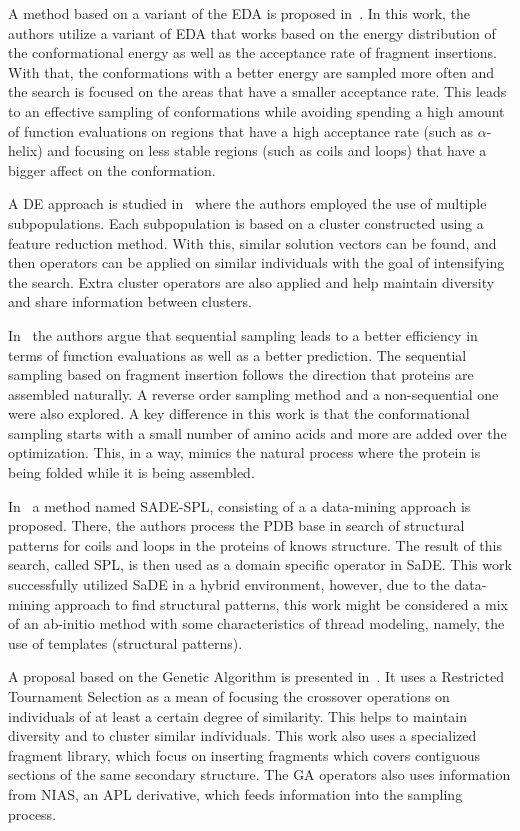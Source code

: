 A method based on a variant of the \ac{EDA} is proposed in~\cite{hao2017double}. In
this work, the authors utilize a variant of \ac{EDA} that works based on the energy
distribution of the conformational energy as well as the acceptance rate of fragment
insertions. With that, the conformations with a better energy are sampled more often
and the search is focused on the areas that have a smaller acceptance rate. This
leads to an effective sampling of conformations while avoiding spending a high
amount of function evaluations on regions that have a high acceptance rate (such
as $\alpha$-helix) and focusing on less stable regions (such as coils and loops)
that have a bigger affect on the conformation.


A \ac{DE} approach is studied in~\cite{hao2017conformational} where the authors
employed the use of multiple subpopulations. Each subpopulation is based on a cluster
constructed using a feature reduction method. With this, similar solution vectors
can be found, and then operators can be applied on similar individuals with the goal
of intensifying the search. Extra cluster operators are also applied and help
maintain diversity and share information between clusters.


In~\cite{de2017sequential} the authors argue that sequential sampling leads to a better
efficiency in terms of function evaluations as well as a better prediction. The sequential
sampling based on fragment insertion follows the direction that proteins are assembled
naturally. A reverse order sampling method and a non-sequential one were also explored.
A key difference in this work is that the conformational sampling starts with a small
number of amino acids and more are added over the optimization. This, in a way, mimics
the natural process where the protein is being folded while it is being assembled.


In~\cite{oliveira2017sade} a method named SADE-SPL, consisting of a a data-mining
approach is proposed. There, the authors process the PDB base in search of structural patterns
for coils and loops in the proteins of knows structure. The result of this search, called
SPL, is then used as a domain specific operator in \ac{SaDE}. This work successfully utilized
\ac{SaDE} in a hybrid environment, however, due to the data-mining approach to find structural
patterns, this work might be considered a mix of an ab-initio method with some
characteristics of thread modeling, namely, the use of templates (structural patterns).

A proposal based on the Genetic Algorithm is presented in~\cite{borguesan2018genetic}. It uses
a Restricted Tournament Selection as a mean of focusing the crossover operations on individuals
of at least a certain degree of similarity. This helps to maintain diversity and to cluster
similar individuals. This work also uses a specialized fragment library,
which focus on inserting fragments which covers contiguous sections of the same secondary structure.
The \ac{GA} operators also uses information from NIAS, an \ac{APL} derivative,
which feeds information into the sampling process.

